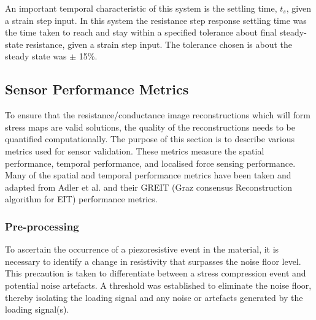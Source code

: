 An important temporal characteristic of this system is the settling time, $t_s$, given a strain step input. In this system the resistance step response settling time was the time taken to reach and stay within a specified tolerance about final steady-state resistance, given a strain step input. The tolerance chosen is about the steady state was $\pm$ 15\%. %

\subsection{Sensor Performance Metrics}\label{sec:Sensor Performance Metrics}
To ensure that the resistance/conductance image reconstructions which will form stress maps are valid solutions, the quality of the reconstructions needs to be quantified computationally. The purpose of this section is to describe various metrics used for sensor validation. These metrics measure the spatial performance, temporal performance, and localised force sensing performance. Many of the spatial and temporal performance metrics have been taken and adapted from Adler et al. \citep{Adler2009} and their GREIT (Graz consensus Reconstruction algorithm for EIT) performance metrics.

\subsubsection{Pre-processing}\label{Pre-processing}
To ascertain the occurrence of a piezoresistive event in the material, it is necessary to identify a change in resistivity that surpasses the noise floor level. This precaution is taken to differentiate between a stress compression event and potential noise artefacts. A threshold was established to eliminate the noise floor, thereby isolating the loading signal and any noise or artefacts generated by the loading signal(s).


